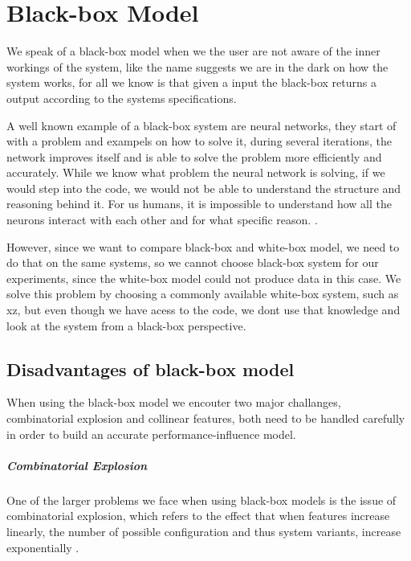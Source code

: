 \chapter{Black-box Model}\label{ch:Blackbox}

We speak of a black-box model when we the user are not aware of the inner workings of the system, like the name suggests we are
in the dark on how the system works, for all we know is that given a input the black-box returns a output according to the systems 
specifications. 

A well known example of a black-box system are neural networks, they start of with a problem and exampels on how to solve it, 
during several iterations, the network improves itself and is able to solve the problem
more efficiently and accurately. While we know what problem the neural network is solving, if we would step into the code, 
we would not be able to understand the structure and reasoning behind it. For us humans, it is impossible to understand how
all the neurons interact with each other and for what specific reason. \cite{NeuralNetworks}.

However, since we want to compare black-box and white-box model, we need to do that on the same systems, so
we cannot choose black-box system for our experiments, since the white-box model could not produce data in this case.
We solve this problem by choosing a commonly available white-box system, such as xz, but even though we have acess to the code, we dont use
that knowledge and look at the system from a black-box perspective.

\section{Disadvantages of black-box model}
When using the black-box model we encouter two major challanges, combinatorial explosion and collinear features, both need to be
handled carefully in order to build an accurate performance-influence model.

\paragraph{Combinatorial Explosion}
One of the larger problems we face when using black-box models is the issue of combinatorial explosion, 
which refers to the effect that when features increase linearly, the number of possible configuration and thus system variants,
 increase exponentially \cite{Combinatorial-explosion}.

